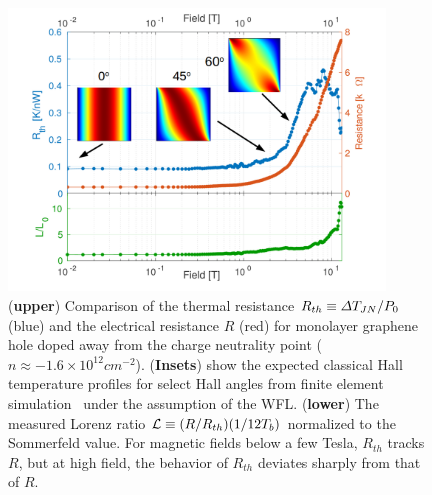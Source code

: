 \begin{figure}
\centering
\includegraphics[width=100mm]{figures/magneto/High_density.png}
\caption{(\textbf{upper}) Comparison of the thermal resistance $R_{th}\equiv \Delta T_{JN}/P_0$ (blue) and the electrical resistance $R$ (red) for monolayer graphene hole doped away from the charge neutrality point ($n\approx-1.6\times10^{12}cm^{-2}$). (\textbf{Insets}) show the expected classical Hall temperature profiles for select Hall angles from finite element simulation~\cite{noauthor_comsol_2017} under the assumption of the WFL. (\textbf{lower}) The measured Lorenz ratio $\mathcal{L} \equiv (R/R_{th})(1/12T_b)$ normalized to the Sommerfeld value. For magnetic fields below a few Tesla, $R_{th}$ tracks $R$, but at high field, the behavior of $R_{th}$ deviates sharply from that of $R$.}
\label{fig:m_high_density}
\end{figure}

